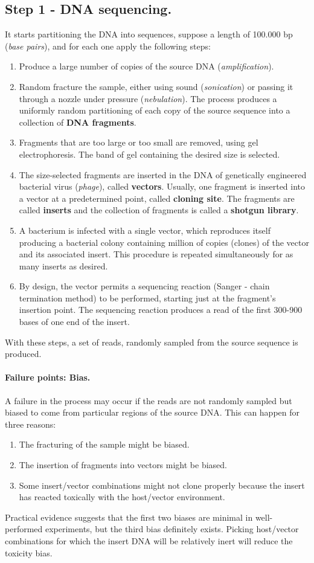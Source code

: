 \subsection{Step 1 - DNA sequencing.}
It starts partitioning the DNA into sequences, suppose a length of 100.000 bp (\textit{base pairs}), and for each one apply the following steps:
\begin{enumerate}
	\item Produce a large number of copies of the source DNA (\textit{amplification}).
	\item Random fracture the sample, either using sound (\textit{sonication}) or passing it through a nozzle under pressure (\textit{nebulation}). The process produces a uniformly random partitioning of each copy of the source sequence into a collection of \textbf{DNA fragments}.
	\item Fragments that are too large or too small are removed, using gel electrophoresis. The band of gel containing the desired size is selected.
	\item The size-selected fragments are inserted in the DNA of genetically engineered bacterial virus (\textit{phage}), called \textbf{vectors}. Usually, one fragment is inserted into a vector at a predetermined point, called \textbf{cloning site}. The fragments are called \textbf{inserts} and the collection of fragments is called a \textbf{shotgun library}.
	\item A bacterium is infected with a single vector, which reproduces itself producing a bacterial colony containing million of copies (clones) of the vector and its associated insert. This procedure is repeated simultaneously for as many inserts as desired.
	\item By design, the vector permits a sequencing reaction (Sanger - chain termination method) to be performed, starting just at the fragment's insertion point. The sequencing reaction produces a read of the first 300-900 bases of one end of the insert.
\end{enumerate}
With these steps, a set of reads, randomly sampled from the source sequence is produced.
\paragraph*{Failure points: Bias.} A failure in the process may occur if the reads are not randomly sampled but biased to come from particular regions of the source DNA. This can happen for three reasons:
\begin{enumerate}
	\item The fracturing of the sample might be biased.
	\item The insertion of fragments into vectors might be biased.
	\item Some insert/vector combinations might not clone properly because the insert has reacted toxically with the host/vector environment.
\end{enumerate}
Practical evidence suggests that the first two biases are minimal in well-performed experiments, but the third bias definitely exists. Picking host/vector combinations for which the insert DNA will be relatively inert will reduce the toxicity bias.

